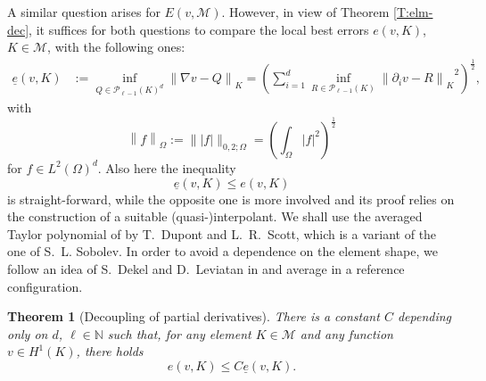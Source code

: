 \documentclass[a4paper]{amsart}
\numberwithin{equation}{section}
\theoremstyle{plain}
\newtheorem{thm}{Theorem}[section]
\theoremstyle{definition}
\begin{document}
A similar question arises for $E(v,{\mathcal{M}})$.  However, in view of Theorem 
\ref{T:elm-dec}, it suffices for both questions to compare the local best 
errors $e(v,{K})$, ${K}\in{\mathcal{M}}$, with the following ones:
\begin{align*}
 {\underline{e}}(v,{K})
 &{:=}
 \inf_{Q\in{\mathcal{P}_{{{\ell}-1}}({{K}})}^d} {\left\|{{\nabla} v-Q}\right\|_{K}}
 =
 \left( \sum_{i=1}^d
  \inf_{R\in{\mathcal{P}_{{{\ell}-1}}({{K}})}} {\left\|{\partial_i v - R}\right\|_{K}}^2
 \right)^{\frac12},
\end{align*}
with
\[
 {\left\|{f}\right\|_{{\Omega}}}
 {:=}
 \| |f| \|_{0,2;\Omega}
 =
 \left(
  \int_\Omega |f|^2
 \right)^{\frac12}
\]
for $f\in{L^{2}}(\Omega)^d$.  Also here the inequality
\[
 {\underline{e}}(v,{K}) \leq e(v,{K})
\]
is straight-forward, while the opposite one is more involved and its proof 
relies on the construction of a suitable (quasi-)interpolant.  We shall use the 
averaged Taylor polynomial of \cite{Dupont.Scott:80} by T.~Dupont and 
L.~R.~Scott, which is a variant of the one of S.\ L. Sobolev.  In order to 
avoid a dependence on the element shape, we follow an idea of S.~Dekel and 
D.~Leviatan in \cite{Dekel.Leviatan:04} and average in a reference 
configuration. 
\begin{thm}[Decoupling of partial derivatives]
\label{T:pder-dec}
There is a constant $C$ depending only on $d$, ${\ell}\in{\mathbb{N}}$ such that, for any 
element ${K}\in{\mathcal{M}}$ and any function $v\in{H^{1}}({K})$, there holds
\[
  e(v,{K})
  \leq
  C {\underline{e}}(v,{K}).
\]
\end{thm}
\end{document}

